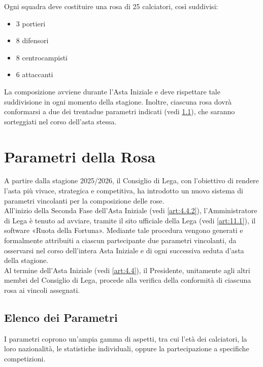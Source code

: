 \noindent Ogni squadra deve costituire una rosa di 25 calciatori, così suddivisi:

\begin{itemize}
\item 3 portieri
\item 8 difensori
\item 8 centrocampisti
\item 6 attaccanti
\end{itemize}

\vspace{0.5cm}
La composizione avviene durante l'Asta Iniziale e deve rispettare tale suddivisione in ogni momento della stagione. Inoltre, ciascuna rosa dovrà conformarsi a due dei trentadue parametri indicati (vedi \ref{art:4.3.1}), che saranno sorteggiati nel corso dell'asta stessa.

\section{Parametri della Rosa}
\label{art:4.3}

A partire dalla stagione 2025/2026, il Consiglio di Lega, con l'obiettivo di rendere l'asta più vivace, strategica e competitiva, ha introdotto un nuovo sistema di parametri vincolanti per la composizione delle rose. \\

All’inizio della Seconda Fase dell’Asta Iniziale (vedi \ref{art:4.4.2}), l’Amministratore di Lega è tenuto ad avviare, tramite il sito ufficiale della Lega (vedi \ref{art:11.1}), il software «Ruota della Fortuna». Mediante tale procedura vengono generati e formalmente attribuiti a ciascun partecipante due parametri vincolanti, da osservarsi nel corso dell’intera Asta Iniziale e di ogni successiva seduta d’asta della stagione. \\

Al termine dell’Asta Iniziale (vedi \ref{art:4.4}), il Presidente, unitamente agli altri membri del Consiglio di Lega, procede alla verifica della conformità di ciascuna rosa ai vincoli assegnati.

\subsection{Elenco dei Parametri}
\label{art:4.3.1}

\noindent
I parametri coprono un'ampia gamma di aspetti, tra cui l'età dei calciatori, la loro nazionalità, le statistiche individuali, oppure la partecipazione a specifiche competizioni.\\

